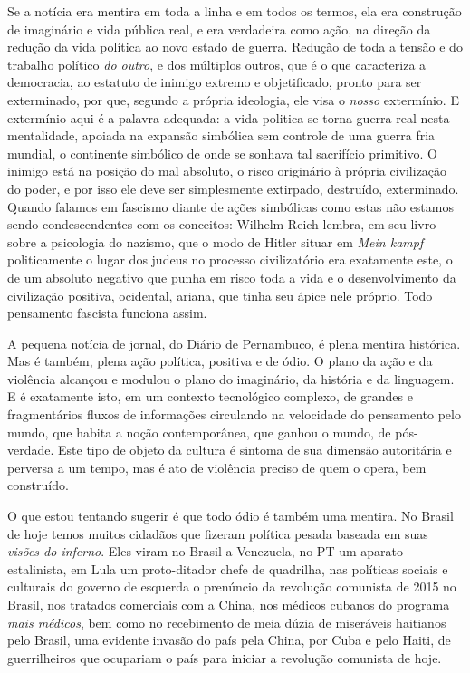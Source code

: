 Se a notícia era mentira em toda a linha e em todos os termos, ela era
construção de imaginário e vida pública real, e era verdadeira como
ação, na direção da redução da vida política ao novo estado de guerra.
Redução de toda a tensão e do trabalho político \emph{do outro}, e dos
múltiplos outros, que é o que caracteriza a democracia, ao estatuto de
inimigo extremo e objetificado, pronto para ser exterminado, por que,
segundo a própria ideologia, ele visa o \emph{nosso} extermínio. E
extermínio aqui é a palavra adequada: a vida politica se torna guerra
real nesta mentalidade, apoiada na expansão simbólica sem controle de
uma guerra fria mundial, o continente simbólico de onde se sonhava tal
sacrifício primitivo. O inimigo está na posição do mal absoluto, o risco
originário à própria civilização do poder, e por isso ele deve ser
simplesmente extirpado, destruído, exterminado. Quando falamos em
fascismo diante de ações simbólicas como estas não estamos sendo
condescendentes com os conceitos: Wilhelm Reich lembra, em seu livro
sobre a psicologia do nazismo, que o modo de Hitler situar em \emph{Mein
kampf} politicamente o lugar dos judeus no processo civilizatório era
exatamente este, o de um absoluto negativo que punha em risco toda a
vida e o desenvolvimento da civilização positiva, ocidental, ariana, que
tinha seu ápice nele próprio. Todo pensamento fascista funciona assim.

A pequena notícia de jornal, do Diário de Pernambuco, é plena mentira
histórica. Mas é também, plena ação política, positiva e de ódio. O
plano da ação e da violência alcançou e modulou o plano do imaginário,
da história e da linguagem. E é exatamente isto, em um contexto
tecnológico complexo, de grandes e fragmentários fluxos de informações
circulando na velocidade do pensamento pelo mundo, que habita a noção
contemporânea, que ganhou o mundo, de pós-verdade. Este tipo de objeto
da cultura é sintoma de sua dimensão autoritária e perversa a um tempo,
mas é ato de violência preciso de quem o opera, bem construído.

O que estou tentando sugerir é que todo ódio é também uma mentira. No
Brasil de hoje temos muitos cidadãos que fizeram política pesada baseada
em suas \emph{visões do inferno}. Eles viram no Brasil a Venezuela, no
PT um aparato estalinista, em Lula um proto-ditador chefe de quadrilha,
nas políticas sociais e culturais do governo de esquerda o prenúncio da
revolução comunista de 2015 no Brasil, nos tratados comerciais com a
China, nos médicos cubanos do programa \emph{mais médicos}, bem como no
recebimento de meia dúzia de miseráveis haitianos pelo Brasil, uma
evidente invasão do país pela China, por Cuba e pelo Haiti, de
guerrilheiros que ocupariam o país para iniciar a revolução comunista de
hoje.

